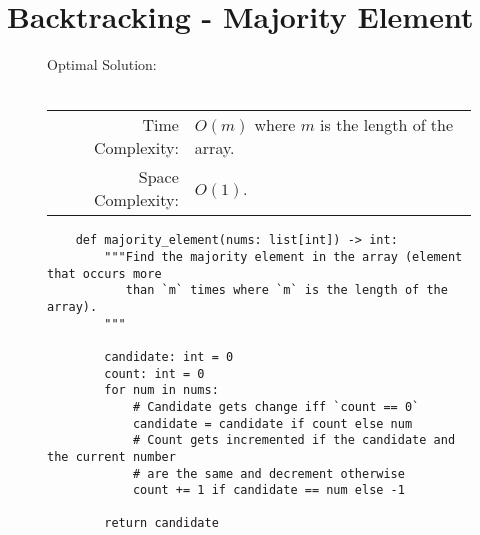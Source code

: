 
\section{Backtracking - Majority Element}

\begin{figure}[H]
    Optimal Solution:\\\\
    \begin{tabular}{rl}
        Time Complexity:& \(O(m)\) where \(m\) is the length of the array.\\
        Space Complexity:& \(O(1)\).
    \end{tabular}
\end{figure}

\begin{figure}[H]
    \centering
    \begin{verbatim}
    def majority_element(nums: list[int]) -> int:
        """Find the majority element in the array (element that occurs more
           than `m` times where `m` is the length of the array).
        """

        candidate: int = 0
        count: int = 0
        for num in nums:
            # Candidate gets change iff `count == 0`
            candidate = candidate if count else num
            # Count gets incremented if the candidate and the current number
            # are the same and decrement otherwise
            count += 1 if candidate == num else -1

        return candidate
    \end{verbatim}
\end{figure}
